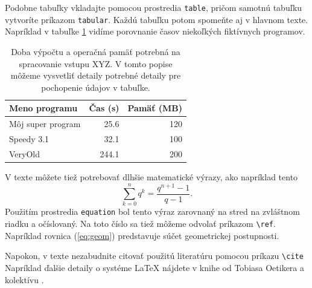 Podobne tabuľky vkladajte pomocou prostredia \verb'table', pričom
samotnú tabuľku vytvoríte príkazom \verb'tabular'. Každú tabuľku potom
spomeňte aj v hlavnom texte. Napríklad v tabuľke \ref{tab:cas}
vidíme porovnanie časov niekoľkých fiktívnych programov.

\begin{table}
\caption[Doba výpočtu a operačná pamäť potrebná na spracovanie vstupu XYZ]{Doba výpočtu a operačná pamäť potrebná na spracovanie vstupu XYZ. V tomto popise môžeme vysvetliť detaily potrebné detaily pre pochopenie údajov v tabuľke.}
\label{tab:cas}
\begin{center}
\begin{tabular}{lrr}
\hline 
Meno programu & Čas (s) & Pamäť (MB) \\
\hline
Môj super program & 25.6 & 120 \\
Speedy 3.1  & 32.1 & 100 \\
VeryOld & 244.1 & 200 \\
\hline
\end{tabular}
\end{center}
\end{table}

V texte môžete tiež potrebovať dlhšie matematické výrazy, ako napríklad tento
\begin{equation}
\sum_{k=0}^n q^k = \frac{q^{n+1}-1}{q-1}.
\label{eq:geom}
\end{equation}
Použitím prostredia \verb'equation' bol tento výraz zarovnaný na stred na
zvláštnom riadku a očíslovaný. Na toto číslo sa tiež môžeme odvolať
príkazom \verb'\ref'. Napríklad rovnica (\ref{eq:geom}) predstavuje súčet 
geometrickej postupnosti.

Napokon, v texte nezabudnite citovať použitú literatúru pomocou príkazu 
\verb'\cite'  Napríklad ďalšie detaily o systéme LaTeX nájdete v knihe od Tobiasa Oetikera a kolektívu \cite{Oetiker2000}.



